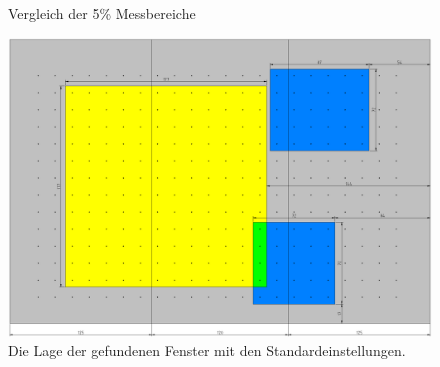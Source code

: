 \documentclass[a4paper,bibtotoc,oneside]{scrbook}
\begin{document}
\begin{figure}
\caption{Vergleich der 5\% Messbereiche}
\label{funf}
\end{figure} 

\begin{figure}[htbp]
\centering
\includegraphics[width=140mm]{img/fensterstd.png}
\caption{Die Lage der gefundenen Fenster mit den Standardeinstellungen.}\label{fstd}
\end{figure}
\end{document}
